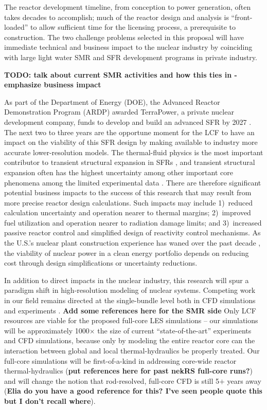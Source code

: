 The reactor development timeline, from conception to power generation, often
takes decades to accomplish; much of the reactor design and analysis is
``front-loaded'' to allow sufficient time for the licensing process, a
prerequisite to construction. The two challenge problems selected in this
proposal will have immediate technical and business impact to the nuclear
industry by coinciding with large light water SMR and SFR development programs
in private industry.

{\bf TODO: talk about current SMR activities and how this ties in - emphasize
business impact}

As part of the Department of Energy (DOE), the Advanced Reactor Demonstration
Program (ARDP) awarded TerraPower, a private nuclear development company, funds
to develop and build an advanced SFR by 2027 \cite{ardp_tp}. The next two to
three years are the opportune moment for the LCF to have an impact on the
viability of this SFR design by making available to industry more accurate
lower-resolution models. The thermal-fluid physics is the most important
contributor to transient structural expansion in SFRs \cite{wozniak}, and
transient structural expansion often has the highest uncertainty among other
important core phenomena among the limited experimental data \cite{lum}. There
are therefore significant potential business impacts to the success of this
research that may result from more precise reactor design calculations. Such
impacts may include 1)~reduced calculation uncertainty and operation nearer to
thermal margins; 2)~improved fuel utilization and operation nearer to radiation
damage limits; and 3)~increased passive reactor control and simplified design
of reactivity control mechanisms. As the U.S.'s nuclear plant construction
experience has waned over the past decade \cite{schlissel}, the viability of
nuclear power in a clean energy portfolio depends on reducing cost through
design simplifications or uncertainty reductions. 

In addition to direct impacts in the nuclear industry, this research will spur
a paradigm shift in high-resolution modeling of nuclear systems. Competing work
in our field remains directed at the single-bundle level both in CFD
simulations \cite{wang2020,fanning,wang2020b} and experiments
\cite{goth,song_2020,martin2020}. {\bf Add some references here for the SMR
side} Only LCF resources are viable for the proposed full-core LES simulations
-- our simulations will be approximately 1000\(\times\) the size of current
``state-of-the-art'' experiments and CFD simulations, because only by modeling
the entire reactor core can the interaction between global and local
thermal-hydraulics be properly treated. Our full-core simulations will be
first-of-a-kind in addressing core-wide reactor thermal-hydraulics \cite{Fang2021} ({\bf put
references here for past nekRS full-core runs?}) and will change the notion
that rod-resolved, full-core CFD is still 5\(+\) years away ({\bf Elia do you
have a good reference for this? I've seen people quote this but I don't recall
where}).

